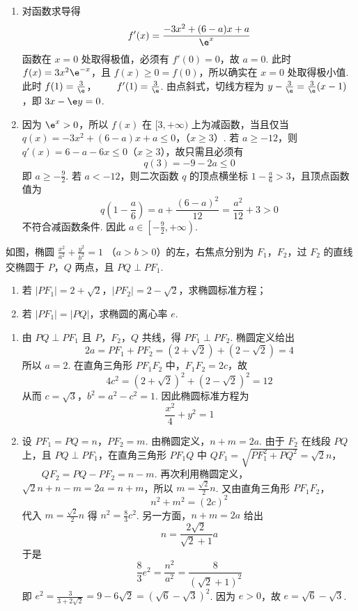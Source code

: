 \begin{solution}
\begin{enumerate}
\item 对函数求导得
\[
f'(x)=\frac{-3x^2+(6-a)x+a}{\e^x}
\]
函数在 \(x=0\) 处取得极值，必须有 \(f'(0)=0\)，故 \(a=0\). 此时 \(f(x)=3x^2\e^{-x}\)，且 \(f(x)\geqslant0=f(0)\)，所以确实在 \(x=0\) 处取得极小值. 此时
\(f(1)=\frac3\e\)，\(\qquad f'(1)=\frac3\e\).
由点斜式，切线方程为 \(y-\frac3\e=\frac3\e(x-1)\)，即 \(3x-\e y=0\).
\item 因为 \(\e^x>0\)，所以 \(f(x)\) 在 \([3,+\infty)\) 上为减函数，当且仅当
\(q(x)=-3x^2+(6-a)x+a\leqslant0\)，（\(x\geqslant3\)）.
若 \(a\geqslant-12\)，则 \(q'(x)=6-a-6x\leqslant0\)（\(x\geqslant3\)），故只需且必须有
\[
q(3)=-9-2a\leqslant0
\]
即 \(a\geqslant-\frac92\). 若 \(a<-12\)，则二次函数 \(q\) 的顶点横坐标 \(1-\frac a6>3\)，且顶点函数值为
\[
q\left(1-\frac a6\right)=a+\frac{(6-a)^2}{12}=\frac{a^2}{12}+3>0
\]
不符合减函数条件. 因此 \(a\in\left[-\frac92,+\infty\right)\).
\end{enumerate}
\end{solution}

\begin{problem}
如图，椭圆 \(\frac{x^2}{a^2} + \frac{y^2}{b^2} = 1 \) （\(a > b > 0\)）的左，右焦点分别为 \(F_1\)，\(F_2\)，过 \(F_2\) 的直线交椭圆于 \(P\)，\(Q\) 两点，且 \(PQ \perp PF_1\).

\begin{enumerate}
\item 若 \( |PF_1| = 2 + \sqrt{2} \)，\( |PF_2| = 2 - \sqrt{2} \)，求椭圆标准方程；
\item 若 \( |PF_1| = |PQ| \)，求椭圆的离心率 \( e \).
\end{enumerate}

\end{problem}

\begin{solution}
\begin{enumerate}
\item 由 \(PQ\perp PF_1\) 且 \(P\)，\(F_2\)，\(Q\) 共线，得 \(PF_1\perp PF_2\). 椭圆定义给出
\[
2a=PF_1+PF_2=(2+\sqrt2)+(2-\sqrt2)=4
\]
所以 \(a=2\). 在直角三角形 \(PF_1F_2\) 中，\(F_1F_2=2c\)，故
\[
4c^2=(2+\sqrt2)^2+(2-\sqrt2)^2=12
\]
从而 \(c=\sqrt3\)，\(b^2=a^2-c^2=1\). 因此椭圆标准方程为
\[
\frac{x^2}{4}+y^2=1
\]
\item 设 \(PF_1=PQ=n\)，\(PF_2=m\). 由椭圆定义，\(n+m=2a\). 由于 \(F_2\) 在线段 \(PQ\) 上，且 \(PQ\perp PF_1\)，在直角三角形 \(PF_1Q\) 中
\(QF_1=\sqrt{PF_1^2+PQ^2}=\sqrt2n\)，\(\qquad QF_2=PQ-PF_2=n-m\).
再次利用椭圆定义，\(\sqrt2n+n-m=2a=n+m\)，所以 \(m=\frac{\sqrt2}{2}n\). 又由直角三角形 \(PF_1F_2\)，
\[
n^2+m^2=(2c)^2
\]
代入 \(m=\frac{\sqrt2}{2}n\) 得 \(n^2=\frac83c^2\). 另一方面，\(n+m=2a\) 给出
\[
n=\frac{2\sqrt2}{\sqrt2+1}a
\]
于是
\[
\frac83e^2=\frac{n^2}{a^2}=\frac{8}{(\sqrt2+1)^2}
\]
即 \(e^2=\frac{3}{3+2\sqrt2}=9-6\sqrt2=(\sqrt6-\sqrt3)^2\). 因为 \(e>0\)，故 \(e=\sqrt6-\sqrt3\).
\end{enumerate}
\end{solution}

